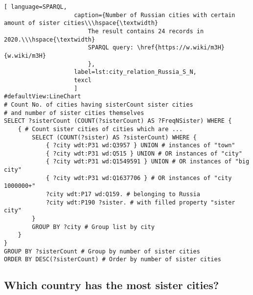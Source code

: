 \begin{lstlisting}[ language=SPARQL, 
                    caption={Number of Russian cities with certain amount of sister cities\\\hspace{\textwidth}
                        The result contains 24 records in 2020.\\\hspace{\textwidth}
                        SPARQL query: \href{https://w.wiki/m3H}{w.wiki/m3H}
                        },
                    label=lst:city_relation_Russia_S_N,
                    texcl 
                    ]
#defaultView:LineChart                                                   
# Count No. of cities having sisterCount sister cities  
# and number of sister cities themselves
SELECT ?sisterCount (COUNT(?sisterCount) AS ?FreqNSister) WHERE {                                                                                  
	{ # Count sister cities of cities which are ...
		SELECT (COUNT(?sister) AS ?sisterCount) WHERE {    
			{ ?city wdt:P31 wd:Q3957 } UNION # instances of "town"
			{ ?city wdt:P31 wd:Q515 } UNION # OR instances of "city"
			{ ?city wdt:P31 wd:Q1549591 } UNION # OR instances of "big city"
			{ ?city wdt:P31 wd:Q1637706 } # OR instances of "city 1000000+"
			?city wdt:P17 wd:Q159. # belonging to Russia
			?city wdt:P190 ?sister. # with filled property "sister city"
		}
		GROUP BY ?city # Group list by city                             
	}
}
GROUP BY ?sisterCount # Group by number of sister cities
ORDER BY DESC(?sisterCount) # Order by number of sister cities
\end{lstlisting}%

\subsection{Which country has the most sister cities?}

